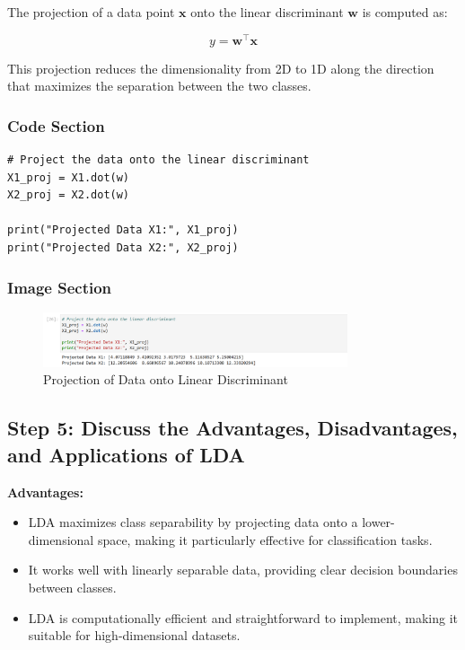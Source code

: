 \documentclass{exam}
\begin{document}
The projection of a data point \( \mathbf{x} \) onto the linear discriminant \( \mathbf{w} \) is computed as:

\[
y = \mathbf{w}^\top \mathbf{x}
\]

This projection reduces the dimensionality from 2D to 1D along the direction that maximizes the separation between the two classes.

\subsubsection*{Code Section}

\begin{verbatim}
# Project the data onto the linear discriminant
X1_proj = X1.dot(w)
X2_proj = X2.dot(w)

print("Projected Data X1:", X1_proj)
print("Projected Data X2:", X2_proj)
\end{verbatim}

\subsubsection*{Image Section}

\begin{figure}[h!]
    \centering
    \includegraphics[width=0.8\textwidth]{images/lda_projection.png}
    \caption{Projection of Data onto Linear Discriminant}
    \label{fig:lda_projection}
\end{figure}

\newpage

\subsection{Step 5: Discuss the Advantages, Disadvantages, and Applications of LDA}

\textbf{Advantages:}
\begin{itemize}
    \item LDA maximizes class separability by projecting data onto a lower-dimensional space, making it particularly effective for classification tasks.
    \item It works well with linearly separable data, providing clear decision boundaries between classes.
    \item LDA is computationally efficient and straightforward to implement, making it suitable for high-dimensional datasets.
\end{itemize}
\end{document}
